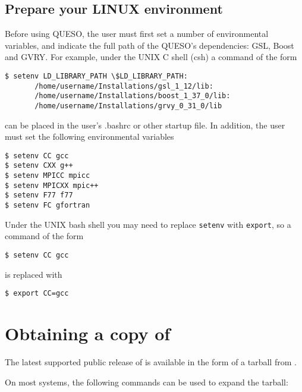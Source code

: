 \subsection{Prepare your LINUX environment}



Before using QUESO, the user must first set a number of environmental variables, and indicate the full path
of the QUESO's dependencies: GSL, Boost and GVRY. For example, under the UNIX C shell (csh) a command of the form
\begin{verbatim}
$ setenv LD_LIBRARY_PATH \$LD_LIBRARY_PATH:
       /home/username/Installations/gsl_1_12/lib:
       /home/username/Installations/boost_1_37_0/lib:
       /home/username/Installations/grvy_0_31_0/lib
\end{verbatim}
can be placed in the user's .bashrc or other startup file. In addition, the user must set the following environmental
variables
\begin{verbatim}
$ setenv CC gcc
$ setenv CXX g++
$ setenv MPICC mpicc
$ setenv MPICXX mpic++
$ setenv F77 f77
$ setenv FC gfortran
\end{verbatim}


Under the UNIX bash shell you may need to replace \texttt{setenv} with \texttt{export}, so a command of the form
\begin{verbatim}
$ setenv CC gcc
\end{verbatim}
is replaced with
\begin{verbatim}
$ export CC=gcc
\end{verbatim}




\section{Obtaining a copy of \Queso{}}

The latest supported public release of \Queso{} is available in the form of a tarball  from \Quesoweb{}.


On most systems, the following commands can be used to expand the tarball:

